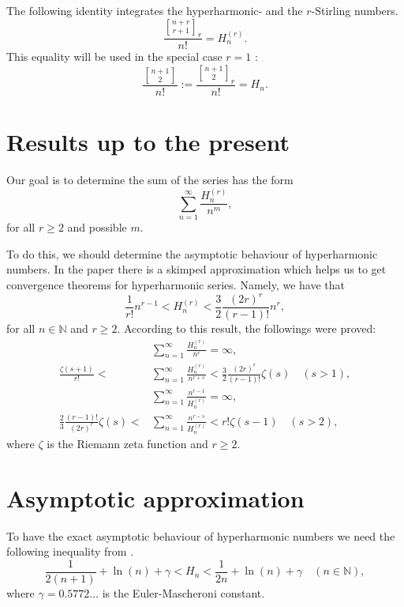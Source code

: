 \documentclass[a4paper,12pt]{amsart}
\begin{document}
The following identity integrates the hyperharmonic- and the $r$-Stirling numbers.
\[\frac{{\genfrac[]{0pt}{}{{n+r}}{{r+1}}}_r}{n!}=H_n^{(r)}.\]
This equality will be used in the special case $r=1$ \cite{GKP}:
\begin{equation}
\frac{{\genfrac[]{0pt}{}{{n+1}}{{2}}}}{n!}:=\frac{{\genfrac[]{0pt}{}{{n+1}}{{2}}}_r}{n!}=H_n.\label{stirling_Hn}
\end{equation}

\section{Results up to the present}

Our goal is to determine the sum of the series has the form
\[\sum_{n=1}^\infty\frac{H_n^{(r)}}{n^m},\]
for all $r\ge 2$ and possible $m$.

To do this, we should determine the asymptotic behaviour of hyperharmonic numbers. In the paper \cite{M} there is a skimped approximation which helps us to get convergence theorems for hyperharmonic series. Namely, we have that
\[\frac{1}{r!}n^{r-1}<H_n^{(r)}<\frac{3}{2}\frac{(2r)^r}{(r-1)!}n^r,\]
for all $n\in{\mathbb{N}}$ and $r\ge 2$.
According to this result, the followings were proved:
\begin{align*}
&\sum_{n=1}^\infty\frac{H_n^{(r)}}{n^r}=\infty,\\
\frac{\zeta(s+1)}{r!}<&\sum_{n=1}^\infty\frac{H_n^{(r)}}{n^{r+s}}<\frac{3}{2}\frac{(2r)^r}{(r-1)!}\zeta(s)\quad(s>1),\\
&\sum_{n=1}^\infty\frac{n^{r-1}}{H_n^{(r)}}=\infty,\\
\frac{2}{3}\frac{(r-1)!}{(2r)^r}\zeta(s)<&\sum_{n=1}^\infty\frac{n^{r-s}}{H_n^{(r)}}<r!\zeta(s-1)\quad(s>2),
\end{align*}
where $\zeta$ is the Riemann zeta function and $r\ge 2$.

\section{Asymptotic approximation}

To have the exact asymptotic behaviour of hyperharmonic numbers we need the following inequality from \cite{CG}.
\begin{equation}
\frac{1}{2(n+1)}+\ln(n)+\gamma<H_n<\frac{1}{2n}+\ln(n)+\gamma\quad(n\in{\mathbb{N}}),\label{Hn_estim}
\end{equation}
where $\gamma=0.5772\dots$ is the Euler-Mascheroni constant.
\end{document}
